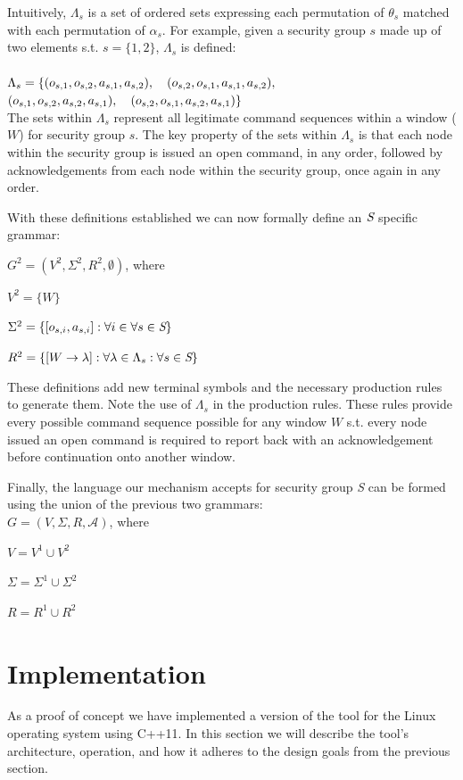 \documentclass[oneside,12pt]{memoir}
\newcommand{\tab}{\hspace*{2em}}
\begin{document}
Intuitively, $\Lambda_s$ is a set of ordered sets expressing each permutation of $\theta_s$ matched with each permutation of $\alpha_s$. For example, given a security group $s$ made up of two elements s.t. $s = \{1, 2\}$, $\Lambda_s$ is defined:\\
\\
$\Lambda_s = \{ (o_{s,1}, o_{s,2}, a_{s,1}, a_{s,2}),\hspace*{1.0em} (o_{s,2}, o_{s,1}, a_{s,1}, a_{s,2}),$\\
\hspace*{3.0em}$ (o_{s,1}, o_{s,2}, a_{s,2}, a_{s,1}),\hspace*{1.0em} (o_{s,2}, o_{s,1}, a_{s,2}, a_{s,1})\}$\\

The sets within $\Lambda_s$ represent all legitimate command sequences within a window ($W$) for security group $s$. The key property of the sets within $\Lambda_s$ is that each node within the security group is issued an open command, in any order, followed by acknowledgements from each node within the security group, once again in any order.

With these definitions established we can now formally define an $\emph{S}$ specific grammar:

\tab $G^2 = (V^2, \Sigma^2, R^2, \emptyset)$, where

\tab $V^2 =\{W\}$

\tab $\Sigma ^2 = \{[o_{s,i}, a_{s,i}]:\forall i \in \forall s\in \emph{S}\}$

\tab $R^2 = \{[W\rightarrow \lambda  ] :\forall \lambda \in \Lambda_s :\forall s\in \emph{S}\}$


These definitions add new terminal symbols and the necessary production rules to generate them. Note the use of $\Lambda_s$ in the production rules. These rules provide every possible command sequence possible for any window $W$ s.t. every node issued an open command is required to report back with an acknowledgement before continuation onto another window.

Finally, the language our mechanism accepts for security group \emph{S} can be formed using the union of the previous two grammars:\\

\tab $G = (V, \Sigma , R, \mathcal{A})$, where

\tab $V = V^1\cup V^2$

\tab $\Sigma = \Sigma ^1\cup \Sigma ^2$

\tab $R = R^1\cup R^2$
\chapter{Implementation}
\label{chap:implementation}
As a proof of concept we have implemented a version of the tool for the Linux operating system using C++11. In this section we will describe the tool's architecture, operation, and how it adheres to the design goals from the previous section.
\end{document}

